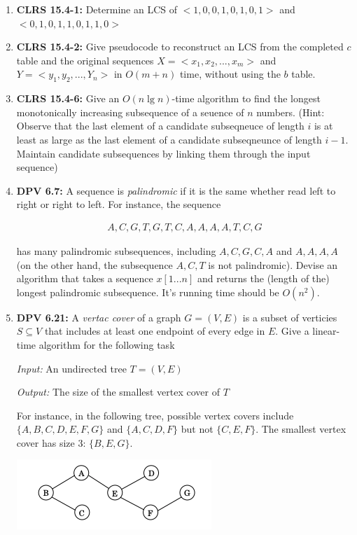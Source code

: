 \documentclass[12pt]{article}
\begin{document}
\begin{enumerate}[1.]
    \item \textbf{CLRS 15.4-1:} Determine an LCS of $<1,0,0,1,0,1,0,1>$ and $<0,1,0,1,1,0,1,1,0>$

    \item \textbf{CLRS 15.4-2:} Give pseudocode to reconstruct an LCS from the completed $c$ table
    and the original sequences $X = <x_1,x_2,...,x_m>$ and $Y = <y_1, y_2, ..., Y_n>$ in $O(m+n)$ time,
    without using the $b$ table.

    \item \textbf{CLRS 15.4-6:} Give an $O(n \lg n)$-time algorithm to find the longest monotonically increasing subsequence
    of a seuence of $n$ numbers. (Hint: Observe that the last element of a candidate subseqneuce of length $i$ is at least as
    large as the last element of a candidate subseqneunce of length $i-1$. Maintain candidate subsequences by linking them
    through the input sequence)

    \item \textbf{DPV 6.7:} A sequence is \textit{palindromic} if it is the same
    whether read left to right or right to left. For instance, the sequence

    \begin{align*}
        A,C,G,T,G,T,C,A,A,A,A,T,C,G
    \end{align*}

    has many palindromic subsequences, including $A,C,G,C,A$ and $A,A,A,A$ (on the other hand,
    the subsequence $A,C,T$ is not palindromic). Devise an algorithm that takes a sequence $x[1...n]$
    and returns the (length of the) longest palindromic subsequence. It's running time should be $O(n^2)$.

    \item \textbf{DPV 6.21:} A \textit{vertac cover} of a graph $G = (V,E)$ is a subset of verticies $S \subseteq V$ that includes
    at least one endpoint of every edge in $E$. Give a linear-time algorithm for the following task

    \bigskip

    \textit{Input:} An undirected tree $T = (V,E)$

    \textit{Output:} The size of the smallest vertex cover of $T$

    \bigskip

    For instance, in the following tree, possible vertex covers include $\{A,B,C,D,E,F,G\}$
    and $\{A,C,D,F\}$ but not $\{C,E,F\}$. The smallest vertex cover has size 3: $\{B,E,G\}$.

    \bigskip

    \begin{center}
    \includegraphics[width=0.7\linewidth]{images/worksheet_3_1.png}
    \end{center}
\end{enumerate}
\end{document}
